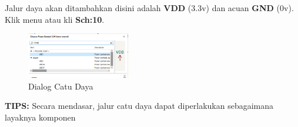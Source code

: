 \documentclass[12pt]{book}
\begin{document}
	Jalur daya akan ditambahkan disini adalah \textbf{VDD} (3.3v) dan acuan \textbf{GND} (0v).
	Klik menu  atau kli \textbf{Sch:10}.

	\begin{figure}[!ht]
		\centering
		\includegraphics[width=0.4\textwidth]{images/sch/sch_8}
		\caption{Dialog Catu Daya}
	\end{figure}

	\textbf{TIPS:} Secara mendasar, jalur catu daya dapat diperlakukan sebagaimana layaknya komponen
\end{document}
